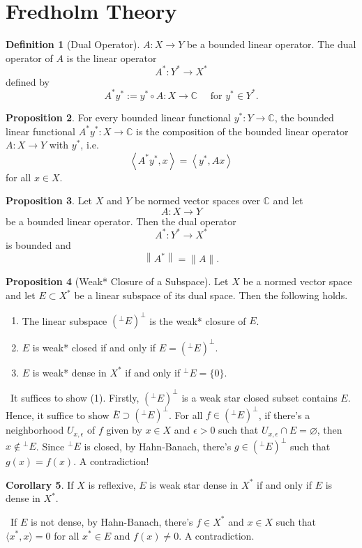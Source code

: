 \documentclass[12pt,a4paper]{book}
\newenvironment{prooff}{{\noindent\it\textcolor{cyan!40!black}{Proof}:}\,}{\par}
\newcommand{\inner}[2]{\langle {#1},{#2}\rangle}
\newenvironment{enu}{\begin{enumerate}[(1)]}{\end{enumerate}}
\theoremstyle{definition}
\newtheorem{defn}{Definition}[section]
\newtheorem{coro}[defn]{Corollary}
\newtheorem{prop}[defn]{Proposition}
\begin{document}
\section{Fredholm Theory}
\begin{defn}[Dual Operator]
$A: X \rightarrow Y$ be a bounded linear operator. The dual operator of $A$ is the linear operator
$$
A^*: Y^* \rightarrow X^*
$$
defined by
$$
A^* y^*:=y^* \circ A: X \rightarrow \mathbb{C} \quad \text { for } y^* \in Y^* .
$$
\end{defn}
\begin{prop}
    For every bounded linear functional $y^*: Y \rightarrow \mathbb{C}$, the bounded linear functional $A^* y^*: X \rightarrow \mathbb{C}$ is the composition of the bounded linear operator $A: X \rightarrow Y$ with $y^*$, i.e.
    $$
    \left\langle A^* y^*, x\right\rangle=\left\langle y^*, A x\right\rangle
    $$
    for all $x \in X$.
\end{prop}
\begin{prop}
    Let $X$ and $Y$ be normed vector spaces over $\mathbb{C}$ and let
    $$
    A: X \rightarrow Y
    $$
    be a bounded linear operator. Then the dual operator
    $$
    A^*: Y^* \rightarrow X^*
    $$
    is bounded and
    $$
    \left\|A^*\right\|=\|A\| .
    $$
\end{prop}
\begin{prop}[Weak* Closure of a Subspace]
    Let $X$ be a normed vector space and let $E \subset X^*$ be a linear subspace of its dual space. Then the following holds.
    \begin{enu} 
    \item The linear subspace $\left({ }^{\perp} E\right)^{\perp}$ is the weak* closure of $E$.
    \item $E$ is weak* closed if and only if $E=\left({ }^{\perp} E\right)^{\perp}$.
    \item $E$ is weak* dense in $X^*$ if and only if ${ }^{\perp} E=\{0\}$.
    \end{enu}
    \label{proposition: weak star closure}
\end{prop}
\begin{prooff}
    It suffices to show (1). Firstly, 
    $\left({ }^{\perp} E\right)^{\perp}$ is a weak star closed subset contains $E$. 
    Hence, it suffice to show $\overline{E}\supset \left({ }^{\perp} E\right)^{\perp} $.
    For all $f\in \left({ }^{\perp} E\right)^{\perp}$, if there's a neighborhood $U_{x,\epsilon}$ 
    of $f$ given by 
    $x\in X$ and $\epsilon>0$ such that $U_{x,\epsilon}\cap E=\varnothing$, then $x\notin {}^\perp E$.
    Since ${}^\perp E$ is closed, by Hahn-Banach, there's $g\in \left({ }^{\perp} E\right)^{\perp}$ such that 
    $g(x)=f(x)$. A contradiction!
\end{prooff}
\begin{coro}
    If $X$ is reflexive, $E$ is weak star dense in $X^*$ 
    if and only if $E$ is dense in $X^*$. 
    \label{corollary: reflexive, weak stat dense}
\end{coro}
\begin{prooff}
    If $E$ is not dense, by Hahn-Banach, there's $f\in X^*$ and $x\in X$ such that 
    $\inner{x^*}{x}=0$ for all $x^*\in E$ and $f(x)\neq 0$. A contradiction.
\end{prooff}
\end{document}
